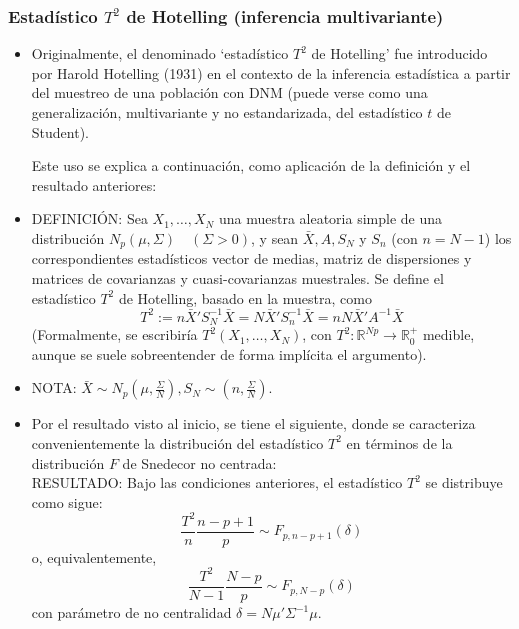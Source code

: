 \documentclass[11pt,a4paper]{article}
\begin{document}
\subsubsection{Estadístico \texorpdfstring{$T^{2}$}) de Hotelling (inferencia multivariante)}
\begin{itemize}
\item Originalmente, el denominado `estadístico $T^{2}$ de Hotelling' fue introducido por Harold Hotelling (1931) en el contexto de la inferencia estadística a partir del muestreo de una población con DNM (puede verse como una generalización, multivariante y no estandarizada, del estadístico $t$ de Student).

Este uso se explica a continuación, como aplicación de la definición y el resultado anteriores:

\item DEFINICIÓN: Sea $X_{1}, \dots, X_{N}$ una muestra aleatoria simple de una distribución $N_{p}(\mu, \Sigma) \quad (\Sigma > 0)$, y sean $\bar{X}, A, S_{N}$ y $S_{n}$ (con $n=N-1$) los correspondientes estadísticos vector de medias, matriz de dispersiones y matrices de covarianzas y cuasi-covarianzas muestrales. Se define el estadístico $T^{2}$ de Hotelling, basado en la muestra, como
$$T^{2} := n\bar{X}'S_{N}^{-1}\bar{X} = N\bar{X}'S_{n}^{-1}\bar{X} = nN\bar{X}'A^{-1}\bar{X}$$
(Formalmente, se escribiría $T^{2}(X_{1}, \dots, X_{N})$, con $T^{2}: \mathbb{R}^{Np} \to \mathbb{R}_{0}^{+}$ medible, aunque se suele sobreentender de forma implícita el argumento).

\item NOTA: $\bar{X} \sim N_{p}(\mu, \frac{\Sigma}{N}), S_{N} \sim (n, \frac{\Sigma}{N})$.

\item Por el resultado visto al inicio, se tiene el siguiente, donde se caracteriza convenientemente la distribución del estadístico $T^{2}$ en términos de la distribución $F$ de Snedecor no centrada: \\
RESULTADO: Bajo las condiciones anteriores, el estadístico $T^{2}$ se distribuye como sigue:
$$\frac{T^{2}}{n} \frac{n-p+1}{p} \sim F_{p, n-p+1}(\delta)$$
o, equivalentemente,
$$\frac{T^{2}}{N-1} \frac{N-p}{p} \sim F_{p, N-p}(\delta)$$
con parámetro de no centralidad $\delta = N\mu'\Sigma^{-1}\mu$.
\end{itemize}
\end{document}
